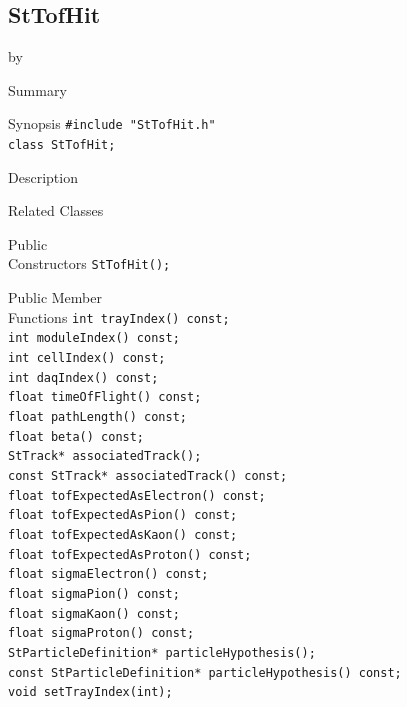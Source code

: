 \documentclass[twoside]{article}
\newcommand{\entrylabel}[1]{\mbox{\textbf{{#1}}}\hfil}%
\newenvironment{entry}
{\begin{list}{}%
    {\renewcommand{\makelabel}{\entrylabel}%
     \setlength{\labelwidth}{90pt}%
     \setlength{\leftmargin}{\labelwidth}
     \advance\leftmargin by \labelsep%
      }%
    }%
  {\end{list}}
\newcommand{\Entrylabel}[1]%
{\raisebox{0pt}[1ex][0pt]{\makebox[\labelwidth][l]%
    {\parbox[t]{\labelwidth}{\hspace{0pt}\textbf{{#1}}}}}}
\newenvironment{Entry}%
{\renewcommand{\entrylabel}{\Entrylabel}\begin{entry}}%
  {\end{entry}}
\begin{document}
\subsection{StTofHit}
\label{sec:StTofHit}
\begin{Entry}
\item[Summary]
\item[Synopsis]
    \verb+#include "StTofHit.h"+\\
    \verb+class StTofHit;+\\
\item[Description]
\item[Related Classes]
\item[Public\\ Constructors]
    \verb+StTofHit();+\\
\item[Public Member\\ Functions]
    \verb+int trayIndex() const;+\\
    \verb+int moduleIndex() const;+\\
    \verb+int cellIndex() const;+\\
    \verb+int daqIndex() const;+\\
    \verb+float timeOfFlight() const;+\\
    \verb+float pathLength() const;+\\
    \verb+float beta() const;+\\
    \verb+StTrack* associatedTrack();+\\
    \verb+const StTrack* associatedTrack() const;+\\
    \verb+float tofExpectedAsElectron() const;+\\
    \verb+float tofExpectedAsPion() const;+\\
    \verb+float tofExpectedAsKaon() const;+\\
    \verb+float tofExpectedAsProton() const;+\\
    \verb+float sigmaElectron() const;+\\
    \verb+float sigmaPion() const;+\\
    \verb+float sigmaKaon() const;+\\
    \verb+float sigmaProton() const;+\\
    \verb+StParticleDefinition* particleHypothesis();+\\
    \verb+const StParticleDefinition* particleHypothesis() const;+\\
    \verb+void setTrayIndex(int);+\\

\end{Entry}
\end{document}
